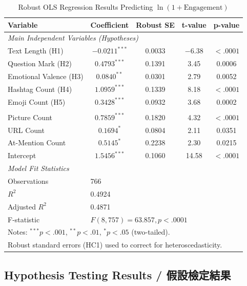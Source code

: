 \documentclass[12pt,a4paper,fontset=none]{ctexart}
\begin{document}
\begin{table}[H]
\centering
\caption{Robust OLS Regression Results Predicting $\ln(1+\text{Engagement})$}
\label{tab:regression_main}
\small
\begin{tabular}{lcccc}
\toprule
Variable & Coefficient & Robust SE & t-value & p-value \\
\midrule
\multicolumn{5}{l}{\textit{Main Independent Variables (Hypotheses)}} \\
Text Length (H1) & $-0.0211^{***}$ & 0.0033 & $-6.38$ & $<.0001$ \\
Question Mark (H2) & $0.4793^{***}$ & 0.1391 & 3.45 & 0.0006 \\
Emotional Valence (H3) & $0.0840^{**}$ & 0.0301 & 2.79 & 0.0052 \\
Hashtag Count (H4) & $1.0959^{***}$ & 0.1339 & 8.18 & $<.0001$ \\
Emoji Count (H5) & $0.3428^{***}$ & 0.0932 & 3.68 & 0.0002 \\
\addlinespace
\multicolumn{5}{l}{\textit{Control Variables}} \\
Picture Count & $0.7859^{***}$ & 0.1820 & 4.32 & $<.0001$ \\
URL Count & $0.1694^{*}$ & 0.0804 & 2.11 & 0.0351 \\
At-Mention Count & $0.5145^{*}$ & 0.2238 & 2.30 & 0.0215 \\
\addlinespace
Intercept & $1.5456^{***}$ & 0.1060 & 14.58 & $<.0001$ \\
\midrule
\multicolumn{5}{l}{\textit{Model Fit Statistics}} \\
Observations & \multicolumn{4}{l}{766} \\
$R^2$ & \multicolumn{4}{l}{0.4924} \\
Adjusted $R^2$ & \multicolumn{4}{l}{0.4871} \\
F-statistic & \multicolumn{4}{l}{$F(8, 757) = 63.857, p < .0001$} \\
\bottomrule
\multicolumn{5}{l}{\small Notes: $^{***} p<.001$, $^{**} p<.01$, $^* p<.05$ (two-tailed).} \\
\multicolumn{5}{l}{\small Robust standard errors (HC1) used to correct for heteroscedasticity.} \\
\end{tabular}
\end{table}

\subsection{Hypothesis Testing Results / 假設檢定結果}
\end{document}
